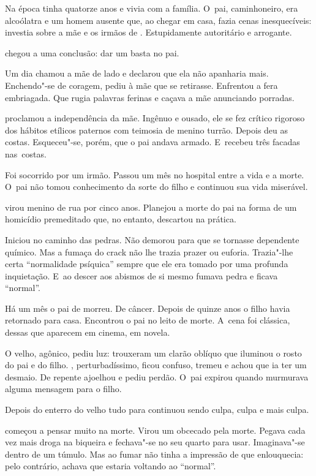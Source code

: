  

Na época  tinha quatorze anos e vivia com a família. O~pai,
caminhoneiro, era alcoólatra e um homem ausente que, ao chegar em casa,
fazia cenas inesquecíveis: investia sobre a mãe e os irmãos de .
Estupidamente autoritário e arrogante.

 chegou a uma conclusão: dar um basta no pai.

Um dia chamou a mãe de lado e declarou que ela não apanharia mais.
Enchendo"-se de coragem, pediu à mãe que se retirasse. Enfrentou a fera
embriagada. Que rugia palavras ferinas e caçava a mãe anunciando
porradas.

 proclamou a independência da mãe. Ingênuo e ousado, ele se fez
crítico rigoroso dos hábitos etílicos paternos com teimosia de menino
turrão. Depois deu as costas. Esqueceu"-se, porém, que o pai andava
armado. E~recebeu três facadas nas~costas.

Foi socorrido por um irmão. Passou um mês no hospital entre a vida e a
morte. O~pai não tomou conhecimento da sorte do filho e continuou sua
vida miserável.

 virou menino de rua por cinco anos. Planejou a morte do pai na forma
de um homicídio premeditado que, no entanto, descartou na prática.

Iniciou no caminho das pedras. Não demorou para que se tornasse
dependente químico. Mas a fumaça do crack não lhe trazia prazer ou
euforia. Trazia"-lhe certa ``normalidade psíquica'' sempre que ele era
tomado por uma profunda inquietação. E~ao descer aos abismos de si mesmo
fumava pedra e ficava ``normal''.

\asterisc{}

Há um mês o pai de  morreu. De câncer. Depois de quinze anos o filho
havia retornado para casa. Encontrou o pai no leito de morte. A~cena foi
clássica, dessas que aparecem em cinema, em novela.

O velho, agônico, pediu luz: trouxeram um clarão oblíquo que iluminou o
rosto do pai e do filho. , perturbadíssimo, ficou confuso, tremeu e
achou que ia ter um desmaio. De repente ajoelhou e pediu perdão. O~pai
expirou quando murmurava alguma mensagem para o filho.

\asterisc{}

Depois do enterro do velho tudo para  continuou sendo culpa, culpa e
mais culpa.

 começou a pensar muito na morte. Virou um obcecado pela morte. Pegava
cada vez mais droga na biqueira e fechava"-se no seu quarto para usar.
Imaginava"-se dentro de um túmulo. Mas ao fumar não tinha a impressão de
que enlouquecia: pelo contrário, achava que estaria voltando ao
``normal''.

